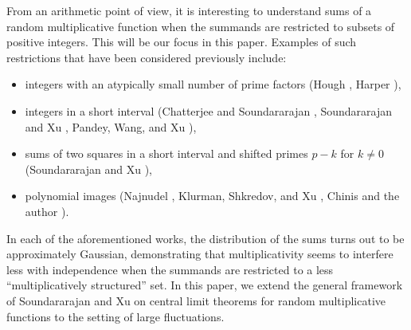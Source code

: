 \documentclass[11pt]{tran-l}
\theoremstyle{definition}
\theoremstyle{remark}
\numberwithin{equation}{section}
\begin{document}
From an arithmetic point of view, it is interesting to understand sums of a random multiplicative function when the summands are restricted to subsets of positive integers. This will be our focus in this paper. Examples of such restrictions that have been considered previously include: 
\begin{itemize}\item[(i)] integers with an atypically small number of prime factors (Hough \cite{Hough2011}, Harper \cite{Harper2013}), 
\item[(ii)] integers in a short interval (Chatterjee and Soundararajan \cite{ChatterjeeSoundararajan2012}, Soundararajan and Xu \cite{soundararajan2023clt}, Pandey, Wang, and Xu \cite{PandeyWangXu2024}), 
\item[(iii)] sums of two squares in a short interval and shifted primes $p-k$ for $k\neq 0$ (Soundararajan and Xu \cite{soundararajan2023clt}), 
\item[(iv)] polynomial images (Najnudel \cite{najnudel2020consecutive}, Klurman, Shkredov, and Xu \cite{KlurmanShkredovXu2023}, Chinis and the author \cite{ChinisShala2025}).
\end{itemize} 
In each of the aforementioned works, the distribution of the sums turns out to be approximately Gaussian, demonstrating that multiplicativity seems to interfere less with independence when the summands are restricted to a less ``multiplicatively structured'' set. In this paper, we extend the general framework of Soundararajan and Xu \cite{soundararajan2023clt} on central limit theorems for random multiplicative functions to the setting of large fluctuations.
\end{document}
